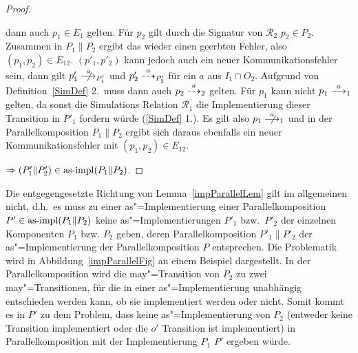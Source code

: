 \begin{proof}
\begin{enumerate}
      dann auch $p_1\in E_1$ gelten. Für $p_2$ gilt durch die Signatur von
      $\mathcal{R}_2$ $p_2\in P_2$. Zusammen in $P_1\|P_2$ ergibt das wieder
      einen geerbten Fehler, also $(p_1,p_2)\in E_{12}$. $(p'_1,p'_2)$ kann
      jedoch auch ein neuer Kommunikationsfehler sein, dann gilt \oBdA
      $p'_1\nmust[a]_{P'_1}$ und $p'_2\may[a]_{P'_2}$ für ein $a$ aus $I_1\cap
      O_2$. Aufgrund von Definition~\ref{SimDef} 2.\ muss dann auch
      $p_2\may[a]_2$ gelten. Für $p_1$ kann nicht $p_1\must[a]_1$ gelten, da
      sonst die Simulations Relation $\mathcal{R}_1$ die Implementierung dieser
      Transition in $P'_1$ fordern würde (\ref{SimDef} 1.). Es gilt also
      $p_1\nmust[a]_1$ und in der Parallelkomposition $P_1\|P_2$ ergibt sich
      daraus ebenfalls ein neuer Kommunikationsfehler mit $(p_1,p_2)\in
      E_{12}$.
  \end{enumerate}
    $\Rightarrow (P'_1\|P'_2)\in\mathrm{as}\text{-}\mathrm{impl} (P_1\|P_2)$.
\end{proof}

Die entgegengesetzte Richtung von Lemma~\ref{impParallelLem} gilt im
allgemeinen nicht, d.h.\ es muss zu einer as"=Implementierung einer
Parallelkomposition $P'\in\mathrm{as}\text{-}\mathrm{impl} (P_1\|P_2)$ keine as"=Implementierungen $P'_1$
bzw.\ $P'_2$ der einzelnen Komponenten $P_1$ bzw. $P_2$ geben, deren
Parallelkomposition $P'_1\|P'_2$ der as"=Implementierung der
Parallelkomposition $P$ entsprechen. Die Problematik wird
in Abbildung~\ref{impParallelFig} an einem Beispiel dargestellt. In der
Parallelkomposition wird die may"=Transition von $P_2$ zu zwei
may"=Transitionen, für die in einer as"=Implementierung unabhängig
entschieden werden kann, ob sie implementiert werden oder nicht. Somit kommt es
in $P'$ zu dem Problem, dass keine as"=Implementierung von $P_2$ (entweder
keine Transition implementiert oder die $o'$ Transition ist implementiert) in
Parallelkomposition mit der Implementierung $P_1$ $P'$ ergeben würde.


